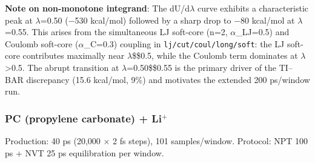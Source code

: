 \documentclass[
  11pt,
]{article}
\begin{document}
\textbf{Note on non-monotone integrand}: The dU/d\(\lambda\) curve
exhibits a characteristic peak at \(\lambda\)=0.50 (−530 kcal/mol)
followed by a sharp drop to −80 kcal/mol at \(\lambda\)=0.55. This
arises from the simultaneous LJ soft-core (n=2, \(\alpha\)\_LJ=0.5) and
Coulomb soft-core (\(\alpha\)\_C=0.3) coupling in
\texttt{lj/cut/coul/long/soft}: the LJ soft-core contributes maximally
near \(\lambda\)\$\approx\$0.5, while the Coulomb term dominates at
\(\lambda\)\textgreater0.5. The abrupt transition at
\(\lambda\)=0.50\$\rightarrow\$0.55 is the primary driver of the TI--BAR
discrepancy (15.6 kcal/mol, 9\%) and motivates the extended 200
ps/window run.

\subsubsection{\texorpdfstring{PC (propylene carbonate) +
Li\(^{+}\)}{PC (propylene carbonate) + Li\^{}\{+\}}}\label{pc-propylene-carbonate-li}

Production: 40 ps (20,000 \(\times\) 2 fs steps), 101 samples/window.
Protocol: NPT 100 ps + NVT 25 ps equilibration per window.
\end{document}
